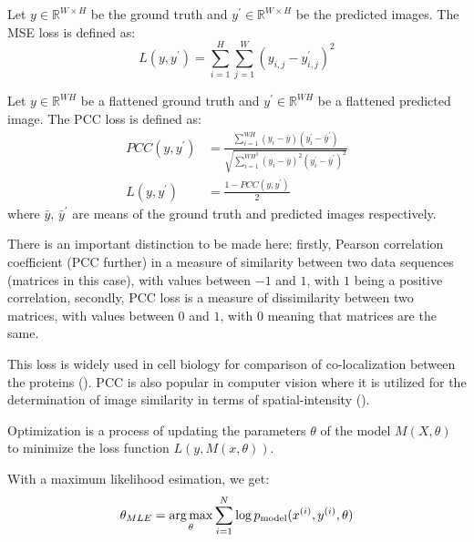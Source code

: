 \begin{definition}
	Let $y \in \mathbb{R}^{W \times H}$ be the ground truth and $y^\prime \in \mathbb{R}^{W \times H}$ be the predicted images. The MSE loss is defined as:
	\begin{equation}
		L(y, y^\prime) = \sum_{i=1}^{H} \sum_{j=1}^{W} (y_{i, j} - y_{i, j}^\prime)^2
	\end{equation}
\end{definition}

\begin{definition}
	\label{def:pcc-loss}
	Let $y \in \mathbb{R}^{WH}$ be a flattened ground truth and $y^\prime \in \mathbb{R}^{WH}$ be a flattened predicted image. The PCC loss is defined as:
	\begin{align}
		PCC(y, y^\prime) &= \frac{\sum_{i=1}^{{WH}}{(y_i - \bar{y})(y_i^\prime - \bar{y}^\prime)}}{\sqrt{\sum_{i=1}^{{WH}^2}{(y_i - \bar{y})^2(y_i^\prime - \bar{y}^\prime)^2}}}  \\
		L(y, y^\prime) &= \frac{1 - PCC(y, y^\prime)}{2}
	\end{align}
	where $\bar{y}$, $\bar{y}^\prime$ are means of the ground truth and predicted images respectively.
	
	There is an important distinction to be made here: firstly, Pearson correlation coefficient (PCC further) in a measure of similarity between two data sequences (matrices in this case), with values between $-1$ and $1$, with $1$ being a positive correlation, secondly, PCC loss is a measure of dissimilarity between two matrices, with values between $0$ and $1$, with $0$ meaning that matrices are the same.

	This loss is widely used in cell biology for comparison of co-localization between the proteins (\cite{Lachance_2020}). PCC is also popular in computer vision where it is utilized for the determination of image similarity in terms of spatial-intensity (\cite{Lachance_2020}).
\end{definition}

\begin{definition}[Optimization]
	Optimization is a process of updating the parameters $\theta$ of the model $M(X, \theta)$ to minimize the loss function $L(y, M(x, \theta))$.
\end{definition}

With a maximum likelihood esimation, we get:
\begin{equation}
	\theta_{MLE} = \operatorname*{arg\,max}\limits_{\theta} \sum_{i=1}^{N} \log{p_{\text{model}}(x^{(i)}, y^{(i)}, \theta)}
\end{equation}

